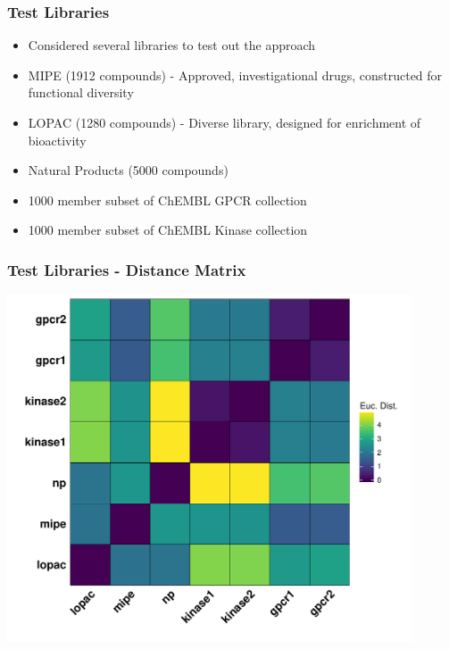 \documentclass[anchorcolor=blue,linkcolor=blue]{beamer}
\begin{document}
\begin{frame}
  \frametitle{Test Libraries}
  \begin{itemize}
  \item Considered several libraries to test out the approach
  \item MIPE (1912 compounds) - Approved, investigational drugs, constructed for functional diversity
  \item LOPAC (1280 compounds) - Diverse library, designed for enrichment of bioactivity
  \item Natural Products (5000 compounds)
  \item 1000 member subset of ChEMBL GPCR collection 
  \item 1000 member subset of ChEMBL Kinase collection
  \end{itemize}
\end{frame}


\begin{frame}
  \frametitle{Test Libraries - Distance Matrix}
  \includegraphics[width=0.9\textwidth]{img-psetbs-distmap.pdf}  
\end{frame}
\end{document}
